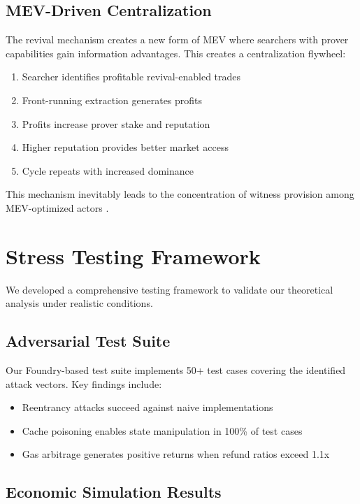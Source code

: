 \documentclass{article}
\begin{document}
\subsection{MEV-Driven Centralization}

The revival mechanism creates a new form of MEV where searchers with prover capabilities gain information advantages. This creates a centralization flywheel:

\begin{enumerate}
\item Searcher identifies profitable revival-enabled trades
\item Front-running extraction generates profits
\item Profits increase prover stake and reputation
\item Higher reputation provides better market access
\item Cycle repeats with increased dominance
\end{enumerate}

This mechanism inevitably leads to the concentration of witness provision among MEV-optimized actors \cite{daian2019}.

\section{Stress Testing Framework}

We developed a comprehensive testing framework to validate our theoretical analysis under realistic conditions.

\subsection{Adversarial Test Suite}

Our Foundry-based test suite implements 50+ test cases covering the identified attack vectors. Key findings include:

\begin{itemize}
\item Reentrancy attacks succeed against naive implementations
\item Cache poisoning enables state manipulation in 100\% of test cases
\item Gas arbitrage generates positive returns when refund ratios exceed 1.1x
\end{itemize}

\subsection{Economic Simulation Results}
\end{document}
